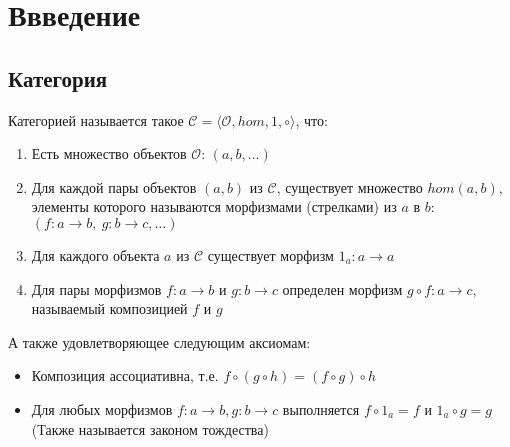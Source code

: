 \section{Ввведение}
\subsection{Категория}
\begin{defn}
  Категорией называется такое
  $\mathcal{C} = \langle \mathcal{O}, hom, 1, \circ \rangle$, что:
  \begin{enumerate}
  \item Есть множество объектов $\mathcal{O}$: $(a, b, \ldots)$
  \item Для каждой пары объектов $(a, b)$ из $\mathcal{C}$, существует множество
    $hom(a, b)$, элементы которого называются морфизмами (стрелками) из $a$ в $b$:
    $(f \colon a \to b,\ g \colon b \to c, \ldots)$
  \item Для каждого объекта $a$ из $\mathcal{C}$ существует морфизм
    $1_a \colon a \to a$
  \item Для пары морфизмов $f \colon a \to b$ и $g \colon b \to c$
    определен морфизм $g \circ f \colon a \to c$, называемый композицией $f$ и $g$
  \end{enumerate}
  А также удовлетворяющее следующим аксиомам:
  \begin{itemize}
  \item Композиция ассоциативна, т.е. $f \circ (g \circ h) = (f \circ g) \circ h$
  \item Для любых морфизмов $f \colon a \to b, g \colon b \to c$ выполняется
    $f \circ 1_a = f$ и $1_a \circ g = g$ (Также называется законом тождества)
  \end{itemize}
\end{defn}

